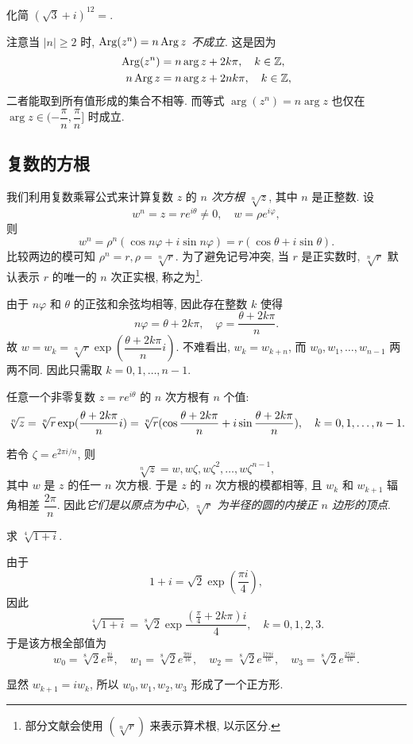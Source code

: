 \begin{exercise}
  化简 $(\sqrt3+i)^12=$\fillblank[6em]{}.
\end{exercise}

注意当 $|n|\ge 2$ 时, \emph{$\operatorname{Arg}(z^n)=n\operatorname{Arg} z$ 不成立}.
这是因为
  \begin{align*}
    \operatorname{Arg}(z^n)&=n\arg z+2k\pi,\quad k\in{\mathbb{Z}},\\
    n\operatorname{Arg} z&=n\arg z+2nk\pi,\quad k\in{\mathbb{Z}},
  \end{align*}
二者能取到所有值形成的集合不相等.
而等式 $\arg(z^n)=n\arg z$ 也仅在 $\arg z\in(-\dfrac{\pi}n,\dfrac\pi n]$ 时成立.

\subsection{复数的方根}

我们利用复数乘幂公式来计算复数 $z$ 的 \emph{$n$ 次方根 $\sqrt[n]z$}, 其中 $n$ 是正整数.
设
  \[w^n=z=re^{i\theta}\neq0,\quad w=\rho e^{i\varphi},\]
则
  \[
    w^n=\rho^n(\cos{n\varphi}+i\sin{n\varphi})
       =r(\cos\theta+i\sin\theta).
  \]
比较两边的模可知 $\rho^n=r,\rho=\sqrt[n]r$.
为了避免记号冲突, 当 $r$ 是正实数时, $\sqrt[n]r$ 默认表示 $r$ 的唯一的 $n$ 次正实根, 称之为\footnote{%
  部分文献会使用 $(\sqrt[n]r)$ 来表示算术根, 以示区分.%
}.

由于 $n\varphi$ 和 $\theta$ 的正弦和余弦均相等, 因此存在整数 $k$ 使得
  \[n\varphi=\theta+2k\pi,\quad \varphi=\frac{\theta+2k\pi}n.\]
故 $w=w_k=\sqrt[n]r\exp(\dfrac{\theta+2k\pi}ni)$.
不难看出, $w_k=w_{k+n}$, 而 $w_0,w_1,\dots,w_{n-1}$ 两两不同.
因此只需取 $k=0,1,\dots,n-1$.
\begin{theorem}\label{thm:root}
  任意一个非零复数 $z=re^{i\theta}$ 的 $n$ 次方根有 $n$ 个值:
  \[
    \sqrt[n]z=\sqrt[n]r\exp(\dfrac{\theta+2k\pi}ni)\\
      =\sqrt[n]r(\cos\frac{\theta+2k\pi}n+i\sin\frac{\theta+2k\pi}n),\quad k=0,1,\dots,n-1.
  \]
\end{theorem}

若令 $\zeta=e^{2\pi i/n}$, 则
\[\sqrt[n]{z}=w,w\zeta,w\zeta^2,\dots,w\zeta^{n-1},\]
其中 $w$ 是 $z$ 的任一 $n$ 次方根.
于是 $z$ 的 $n$ 次方根的模都相等, 且 $w_k$ 和 $w_{k+1}$ 辐角相差 $\dfrac{2\pi}n$.
因此\emph{它们是以原点为中心, $\sqrt[n]r$ 为半径的圆的内接正 $n$ 边形的顶点}.

\begin{example}
  求 $\sqrt[4]{1+i}$.
\end{example}

\begin{solution}
  由于
    \[1+i=\sqrt2\exp(\dfrac{\pi i}4),\]
  因此
    \[\sqrt[4]{1+i}=\sqrt[8]2\exp\frac{(\frac\pi4+2k\pi)i}4,\quad k=0,1,2,3.\]
  于是该方根全部值为
    \[w_0=\sqrt[8]2e^{\frac{\pi i}{16}},\quad
    w_1=\sqrt[8]2e^{\frac{9\pi i}{16}},\quad
    w_2=\sqrt[8]2e^{\frac{17\pi i}{16}},\quad
    w_3=\sqrt[8]2e^{\frac{25\pi i}{16}}.\]
\end{solution}
显然 $w_{k+1}=iw_k$,
所以 $w_0,w_1,w_2,w_3$ 形成了一个正方形.

